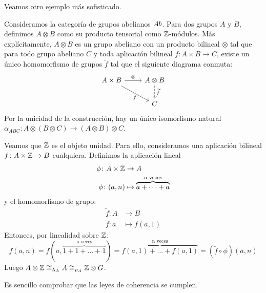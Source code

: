 Veamos otro ejemplo más sofisticado.
\begin{example}
\label{ej-abeliano}
Consideramos la categoría de grupos abelianos ${Ab}$.
Para dos grupos $A$ y $B$, definimos $A \otimes B$ como su producto tensorial como ${\mathbb{Z}}$-módulos.
Más explícitamente, $A \otimes B$ es un grupo abeliano con un producto bilineal $\otimes$ tal que para todo grupo abeliano $C$ y toda aplicación bilineal $f \colon A \times B \to C$, existe un único homomorfismo de grupos $\widetilde{f}$ tal que el siguiente diagrama conmuta:
\[ \begin{tikzcd}{A \times B} \arrow[dr,"f" below] \arrow[r,"\otimes"] & {A \otimes B}\arrow[d,"\widetilde{f}",dashed]\\
& C \end{tikzcd}\]
Por la unicidad de la construcción, hay un único isomorfismo natural $\alpha_{ABC} \colon A \otimes (B \otimes C) \to (A \otimes B) \otimes C$.

Veamos que ${\mathbb{Z}}$ es el objeto unidad.
Para ello, consideramos una aplicación bilineal $f \colon A \times {\mathbb{Z}} \to B$ cualquiera.
Definimos la aplicación lineal
\begin{align*}
\phi \colon A \times {\mathbb{Z}} & \to A\\
\phi \colon (a,n) & \mapsto \overbrace{a + \dots + a}^\text{n veces}
\end{align*}
y el homomorfismo de grupo:
\begin{align*}
\widetilde{f} \colon A & \to B\\
\widetilde{f} \colon a & \mapsto f(a,1)
\end{align*}
Entonces, por linealidad sobre ${\mathbb{Z}}$:
\[ f(a,n) = f(a,\overbrace{1 + 1 + \dots + 1}^\text{n veces}) = \overbrace{f(a,1) + \dots + f(a,1)}^\text{n veces} = (\widetilde{f} \circ \phi)(a,n)\]
Luego $A \otimes {\mathbb{Z}} \cong_{\lambda_A} A \cong_{\rho_A} {\mathbb{Z}} \otimes G$.

Es sencillo comprobar que las leyes de coherencia se cumplen.
\end{example}

